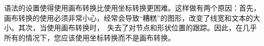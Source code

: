 
语法的设置使得使用画布转换比使用坐标转换更困难。这样做有两个原因：首先，画布转换的使用必须非常小心，经常会导致``糟糕''的图形，改变了线宽和文本的大小。其次，当使用画布转换时，\pgfname\ 失去了对节点和形状位置的跟踪。因此，在几乎所有的情况下，您应该使用坐标转换而不是画布转换。

